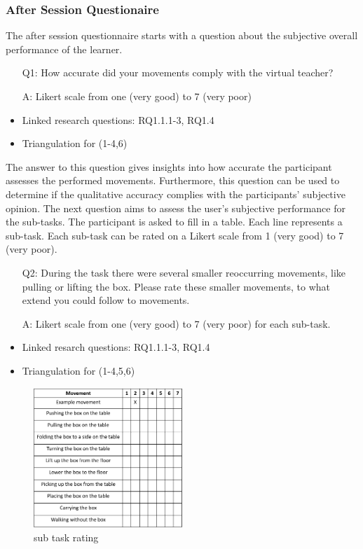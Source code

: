 \subsubsection{After Session Questionaire}
The after session questionnaire starts with a question about the subjective overall performance of the learner. 
\begin{itemize}
	\item[Q1:] How accurate did your movements comply with the virtual teacher?
	\item[A:] Likert scale from one (very good) to 7 (very poor)
	\item Linked research questions: RQ1.1.1-3, RQ1.4
	\item Triangulation for (1-4,6)
\end{itemize}
The answer to this question gives insights into how accurate the participant assesses the performed movements. Furthermore, this question can be used to determine if the qualitative accuracy complies with the participants' subjective opinion. The next question aims to assess the user's subjective performance for the sub-tasks. The participant is asked to fill in a table. Each line represents a sub-task. Each sub-task can be rated on a Likert scale from 1 (very good) to 7 (very poor).
\begin{itemize}
	\item[Q2:] During the task there were several smaller reoccurring movements, like pulling or lifting the box. Please rate these smaller movements, to what extend you could follow to movements.
	\item[A:] Likert scale from one (very good) to 7 (very poor) for each sub-task.
	\item Linked resarch questions: RQ1.1.1-3, RQ1.4
	\item Triangulation for (1-4,5,6)
\end{itemize}
\begin{figure}[H]
	\centering
	\includegraphics[width=0.5\textwidth]{figures/sub-task-rating.png}
	\caption[sub task rating]{sub task rating}
	\label{fig:subtaskrating}
\end{figure}
